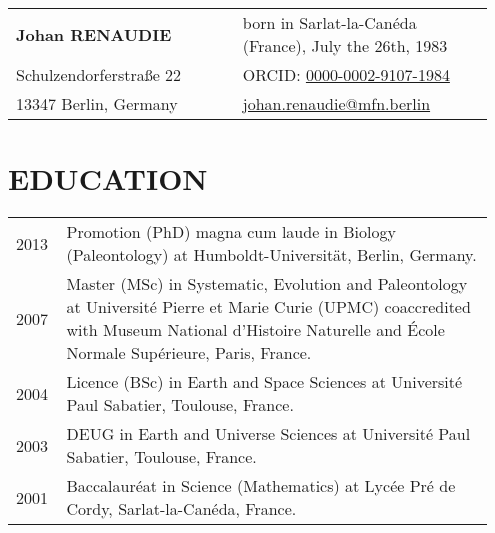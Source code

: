 \documentclass[11pt, a4paper]{article}
\begin{document}
\begin{longtable}{p{0.45\linewidth} >{\raggedleft\arraybackslash}p{0.5\linewidth}}
{\bfseries \Large Johan RENAUDIE} & born in Sarlat-la-Can\'{e}da (France), July the 26th, 1983 \\
Schulzendorferstra\ss e 22  & ORCID: \href{http://orcid.org/0000-0002-9107-1984}{0000-0002-9107-1984}\\
13347 Berlin, Germany & \href{mailto:johan.renaudie@mfn.berlin}{johan.renaudie@mfn.berlin}\\
\hline
\end{longtable}
\section{EDUCATION}
\begin{longtable}{p{0.1\linewidth} P{0.85\linewidth}}

2013 & Promotion (PhD) magna cum laude in Biology (Paleontology) at Humboldt-Universit\"{a}t, Berlin, Germany.\\
2007 & Master (MSc) in Systematic, Evolution and Paleontology at Universit\'{e} Pierre et Marie Curie (UPMC) coaccredited with Museum National d'Histoire Naturelle and \'{E}cole Normale Sup\'{e}rieure, Paris, France.\\
2004 & Licence (BSc) in Earth and Space Sciences at Universit\'{e} Paul Sabatier, Toulouse, France.\\
2003 & DEUG in Earth and Universe Sciences at Universit\'{e} Paul Sabatier, Toulouse, France.\\
2001 & Baccalaur\'{e}at in Science (Mathematics) at Lyc\'{e}e Pr\'{e} de Cordy, Sarlat-la-Can\'{e}da, France.\\
\end{longtable}
\end{document}
